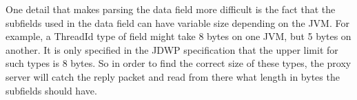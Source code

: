 \documentclass[..thesis.tex]{subfiles}
\begin{document}
One detail that makes parsing the data field more difficult is the fact that the subfields used in the data field can have variable size depending on the JVM.
For example, a ThreadId type of field might take 8 bytes on one JVM, but 5 bytes on another.
It is only specified in the JDWP specification that the upper limit for such types is 8 bytes.
So in order to find the correct size of these types, the proxy server will catch the  reply packet and read from there what length in bytes the subfields should have.
\end{document}
